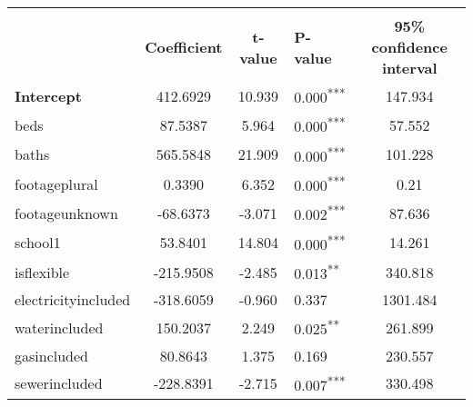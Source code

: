 \documentclass[12pt]{report}
\begin{document}
\renewcommand{\arraystretch}{0.5}
\begin{table}[H]
	\centering
	\begin{tabular}{l S[table-format=5.4] S[table-format=4.4] l S[table-format=4.4]}
		\hline\hline \\
		                                                 & \textbf{Coefficient} & \textbf{t-value} & \textbf{P-value}           & \textbf{95\% confidence interval} \\ \hline
		\textbf{Intercept}                               & 412.6929             & 10.939           & 0.000\textsuperscript{***} & 147.934                           \\
		beds                                             & 87.5387              & 5.964            & 0.000\textsuperscript{***} & 57.552                            \\
		baths                                            & 565.5848             & 21.909           & 0.000\textsuperscript{***} & 101.228                           \\
		footageplural                                    & 0.3390               & 6.352            & 0.000\textsuperscript{***} & 0.21                              \\
		footageunknown                                   & -68.6373             & -3.071           & 0.002\textsuperscript{***} & 87.636                            \\
		school1                                          & 53.8401              & 14.804           & 0.000\textsuperscript{***} & 14.261                            \\
		is\textunderscore flexible                       & -215.9508            & -2.485           & 0.013\textsuperscript{**}  & 340.818                           \\
		electricityincluded                              & -318.6059            & -0.960           & 0.337                      & 1301.484                          \\
		waterincluded                                    & 150.2037             & 2.249            & 0.025\textsuperscript{**}  & 261.899                           \\
		gasincluded                                      & 80.8643              & 1.375            & 0.169                      & 230.557                           \\
		sewerincluded                                    & -228.8391            & -2.715           & 0.007\textsuperscript{***} & 330.498                           \\

\end{tabular}
\end{table}
\end{document}
